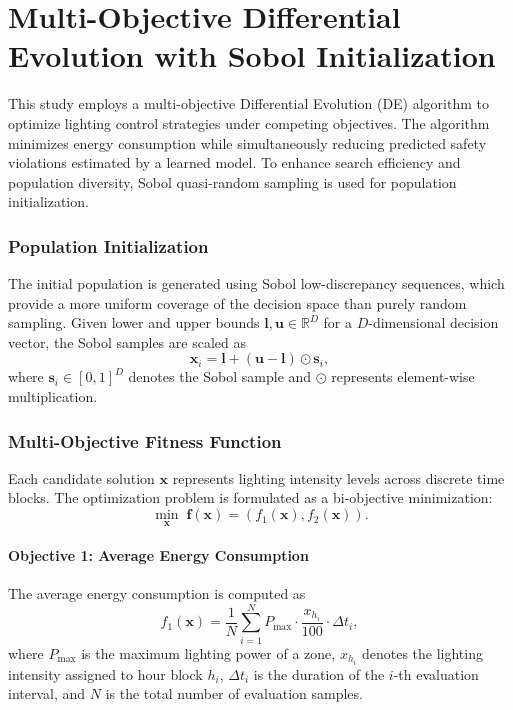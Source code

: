 \documentclass[conference]{IEEEtran}
\begin{document}
\section{Multi-Objective Differential Evolution with Sobol Initialization}

This study employs a multi-objective Differential Evolution (DE) algorithm to optimize lighting control strategies under competing objectives. The algorithm minimizes energy consumption while simultaneously reducing predicted safety violations estimated by a learned model. To enhance search efficiency and population diversity, Sobol quasi-random sampling is used for population initialization.

\subsubsection{Population Initialization}

The initial population is generated using Sobol low-discrepancy sequences, which provide a more uniform coverage of the decision space than purely random sampling. Given lower and upper bounds $\mathbf{l}, \mathbf{u} \in \mathbb{R}^D$ for a $D$-dimensional decision vector, the Sobol samples are scaled as
\begin{equation}
\mathbf{x}_i = \mathbf{l} + (\mathbf{u} - \mathbf{l}) \odot \mathbf{s}_i,
\end{equation}
where $\mathbf{s}_i \in [0,1]^D$ denotes the Sobol sample and $\odot$ represents element-wise multiplication.

\subsubsection{Multi-Objective Fitness Function}

Each candidate solution $\mathbf{x}$ represents lighting intensity levels across discrete time blocks. The optimization problem is formulated as a bi-objective minimization:
\begin{equation}
\min_{\mathbf{x}} \; \mathbf{f}(\mathbf{x}) = \left( f_1(\mathbf{x}), f_2(\mathbf{x}) \right).
\end{equation}

\paragraph{Objective 1: Average Energy Consumption}

The average energy consumption is computed as
\begin{equation}
f_1(\mathbf{x}) = \frac{1}{N} \sum_{i=1}^{N} P_{\max} \cdot \frac{x_{h_i}}{100} \cdot \Delta t_i,
\end{equation}
where $P_{\max}$ is the maximum lighting power of a zone, $x_{h_i}$ denotes the lighting intensity assigned to hour block $h_i$, $\Delta t_i$ is the duration of the $i$-th evaluation interval, and $N$ is the total number of evaluation samples.
\end{document}

